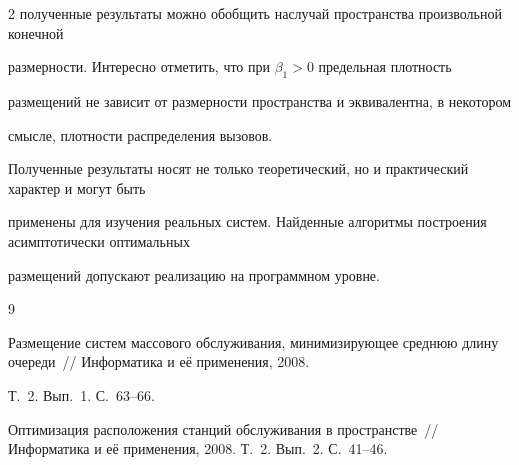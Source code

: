 \begin{multicols}{2}
полученные результаты можно обобщить на\linebreak случай пространства произвольной конечной 


раз\-мер\-ности. Интересно отметить, что при $\beta_1 >0$ предельная плотность 


размещений не зависит от размерности пространства и эквивалентна, в некотором 


смысле, плотности распределения вызовов.





Полученные результаты носят не только теоретический, но и практический характер и могут быть 


применены для изучения реальных систем. Найденные алгоритмы построения асимптотически оптимальных 


размещений допускают реализацию на программном уровне.





{\small\frenchspacing


{%




\begin{thebibliography}{9}












Размещение систем массового обслуживания, минимизирующее среднюю длину очереди~// Информатика и её применения, 2008. 


Т.~2. Вып.~1. С.~63--66.









Оптимизация расположения станций обслуживания в пространстве~// Информатика и её применения, 2008. Т.~2. Вып.~2. С.~41--46.








\label{end\stat}










\end{thebibliography}}}
\end{multicols}
